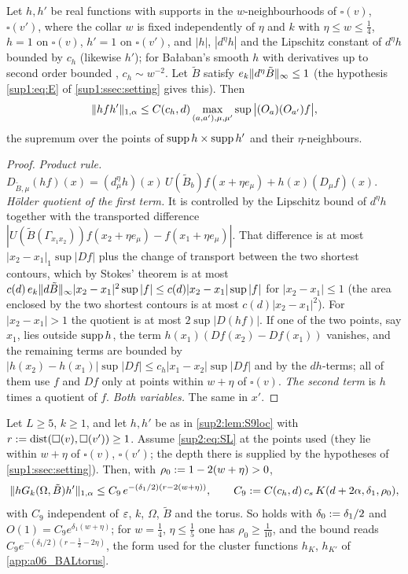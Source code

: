 \begin{lemma}\label{sup2:lem:S9loc}
Let $h,h'$ be real functions with supports in the $w$-neighbourhoods of $\square(v)$, $\square(v')$, where the collar $w$ is fixed independently of $\eta$ and $k$ with $\eta\le w\le\frac14$, $h=1$ on $\square(v)$, $h'=1$ on $\square(v')$, and $|h|$, $|d^\eta h|$ and the Lipschitz constant of $d^\eta h$ bounded by $c_h$ (likewise $h'$); for Ba{\l}aban's smooth $h$ with derivatives up to second order bounded \cite[pp.~412, 420]{Ba3}, $c_h\sim w^{-2}$. Let $\tilde B$ satisfy $e_k\lVert d^\eta\tilde B\rVert_\infty\le1$ (the hypothesis \eqref{sup1:eq:E} of \cref{sup1:ssec:setting} gives this). Then
\[
\lVert hfh'\rVert_{1,\alpha}\le C(c_h,d)\max_{(a,a'),\mu,\mu'}\sup\big|(O_a)(O_{a'})f\big|,
\]
the supremum over the points of $\operatorname{supp} h\times\operatorname{supp} h'$ and their $\eta$-neighbours.
\end{lemma}

\begin{proof}
\emph{Product rule.} $D_{\tilde B,\mu}(hf)(x)=(d^\eta_\mu h)(x)\,U(\tilde B_b)f(x+\eta e_\mu)+h(x)(D_\mu f)(x)$. \emph{H\"older quotient of the first term.} It is controlled by the Lipschitz bound of $d^\eta h$ together with the transported difference $|U(\tilde B(\Gamma_{x_1x_2}))f(x_2+\eta e_\mu)-f(x_1+\eta e_\mu)|$. That difference is at most $|x_2-x_1|_1\sup|Df|$ plus the change of transport between the two shortest contours, which by Stokes' theorem is at most $c(d)\,e_k\lVert d\tilde B\rVert_\infty|x_2-x_1|^2\sup|f|\le c(d)|x_2-x_1|\sup|f|$ for $|x_2-x_1|\le1$ (the area enclosed by the two shortest contours is at most $c(d)|x_2-x_1|^2$). For $|x_2-x_1|>1$ the quotient is at most $2\sup|D(hf)|$. If one of the two points, say $x_1$, lies outside $\operatorname{supp} h$, the term $h(x_1)(Df(x_2)-Df(x_1))$ vanishes, and the remaining terms are bounded by $|h(x_2)-h(x_1)|\sup|Df|\le c_h|x_1-x_2|\sup|Df|$ and by the $dh$-terms; all of them use $f$ and $Df$ only at points within $w+\eta$ of $\square(v)$. \emph{The second term} is $h$ times a quotient of $f$. \emph{Both variables.} The same in $x'$.
\end{proof}

\begin{proposition}\label{sup2:prop:S9}
Let $L\ge5$, $k\ge1$, and let $h,h'$ be as in \cref{sup2:lem:S9loc} with $r:=\operatorname{dist}(\square(v),\square(v'))\ge1$. Assume \eqref{sup2:eq:SL} at the points used (they lie within $w+\eta$ of $\square(v)$, $\square(v')$; the depth there is supplied by the hypotheses of \cref{sup1:ssec:setting}). Then, with $\rho_0:=1-2(w+\eta)>0$,
\[
\lVert hG_k(\Omega,\tilde B)h'\rVert_{1,\alpha}\le C_9\,e^{-(\delta_1/2)(r-2(w+\eta))},\qquad C_9:= C(c_h,d)\,c_s\,K(d+2\alpha,\delta_1,\rho_0),
\]
with $C_9$ independent of $\varepsilon$, $k$, $\Omega$, $\tilde B$ and the torus. So \cite[(3.1)]{Ba3} holds with $\delta_0:=\delta_1/2$ and $O(1)=C_9e^{\delta_1(w+\eta)}$; for $w=\frac14$, $\eta\le\frac15$ one has $\rho_0\ge\frac1{10}$, and the bound reads $C_9e^{-(\delta_1/2)(r-\frac12-2\eta)}$, the form used for the cluster functions $h_K$, $h_{K'}$ of \cref{app:a06_BALtorus}.
\end{proposition}


